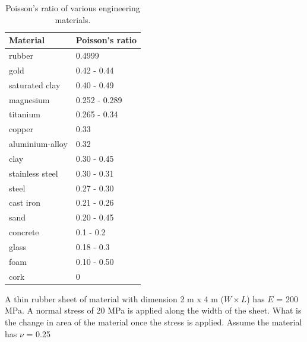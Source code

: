 \documentclass[
10pt,
a4paper,
openany,
svgnames,
]{book} %
\begin{document}
\begin{table}[h]
  \centering
  \caption{Poisson's ratio of various engineering materials.}
  \label{table: poisson's of materials}
  {\renewcommand\arraystretch{1.2}
    \begin{tabular}{ll}
      \toprule
      Material        & Poisson's ratio \\
      \midrule
      rubber          & 0.4999          \\
      gold            & 0.42 - 0.44       \\
      saturated clay  & 0.40 - 0.49       \\
      magnesium       & 0.252 - 0.289     \\
      titanium        & 0.265 - 0.34      \\
      copper          & 0.33            \\
      aluminium-alloy & 0.32            \\
      clay            & 0.30 - 0.45       \\
      stainless steel & 0.30 - 0.31       \\
      steel           & 0.27 - 0.30       \\
      cast iron       & 0.21 - 0.26       \\
      sand            & 0.20 - 0.45       \\
      concrete        & 0.1 - 0.2         \\
      glass           & 0.18 - 0.3        \\
      foam            & 0.10 - 0.50       \\
      cork            & 0               \\
      \bottomrule
    \end{tabular}}
\end{table}

\begin{example}
A thin rubber sheet of material with dimension 2 m x 4 m ($W \times L$) has $E$ = 200 MPa. A normal stress of 20 MPa is applied along the width of the sheet. What is the change in area of the material once the stress is applied. Assume the material has $\nu$ = 0.25
\end{example}
\end{document}
